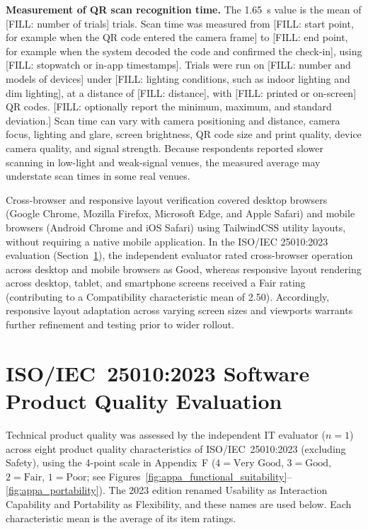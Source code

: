 \hspace*{\parindent}\textbf{Measurement of QR scan recognition time.} The 1.65~s value is the mean of [FILL: number of trials] trials. Scan time was measured from [FILL: start point, for example when the QR code entered the camera frame] to [FILL: end point, for example when the system decoded the code and confirmed the check-in], using [FILL: stopwatch or in-app timestamps]. Trials were run on [FILL: number and models of devices] under [FILL: lighting conditions, such as indoor lighting and dim lighting], at a distance of [FILL: distance], with [FILL: printed or on-screen] QR codes. [FILL: optionally report the minimum, maximum, and standard deviation.] Scan time can vary with camera positioning and distance, camera focus, lighting and glare, screen brightness, QR code size and print quality, device camera quality, and signal strength. Because respondents reported slower scanning in low-light and weak-signal venues, the measured average may understate scan times in some real venues.
\vspace{5mm}

\hspace*{\parindent}Cross-browser and responsive layout verification covered desktop browsers (Google Chrome, Mozilla Firefox, Microsoft Edge, and Apple Safari) and mobile browsers (Android Chrome and iOS Safari) using TailwindCSS utility layouts, without requiring a native mobile application. In the ISO/IEC 25010:2023 evaluation (Section~\ref{sec:iso_25010_software_product_quality_evaluation}), the independent evaluator rated cross-browser operation across desktop and mobile browsers as Good, whereas responsive layout rendering across desktop, tablet, and smartphone screens received a Fair rating (contributing to a Compatibility characteristic mean of 2.50). Accordingly, responsive layout adaptation across varying screen sizes and viewports warrants further refinement and testing prior to wider rollout.
\vspace{5mm}

\section{ISO/IEC~25010:2023 Software Product Quality Evaluation}
\label{sec:iso_25010_software_product_quality_evaluation}

\hspace*{\parindent}Technical product quality was assessed by the independent IT evaluator ($n = 1$) across eight product quality characteristics of ISO/IEC~25010:2023 (excluding Safety), using the 4-point scale in Appendix~F ($4 = \text{Very Good}$, $3 = \text{Good}$, $2 = \text{Fair}$, $1 = \text{Poor}$; see Figures~\ref{fig:appa_functional_suitability}--\ref{fig:appa_portability}). The 2023 edition renamed Usability as Interaction Capability and Portability as Flexibility, and these names are used below. Each characteristic mean is the average of its item ratings.
\vspace{5mm}

